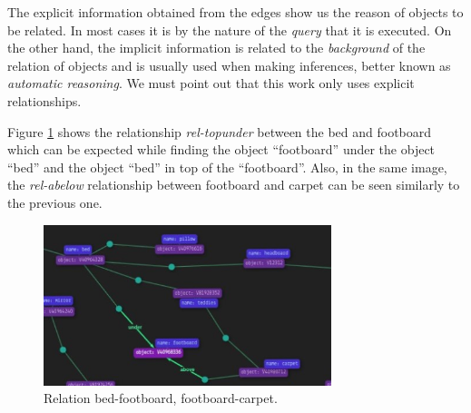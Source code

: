 The explicit information obtained from the edges show us the reason of objects 
to be related. In most cases it is by the nature of the 
\textit{query} that it is executed. On the other hand, the implicit 
information is related to the \textit{background} of the relation of objects 
and is usually used when making inferences, better known as 
\textit{automatic reasoning}. We must point out that this work only 
uses explicit relationships.

Figure \ref{fig:ReGra} shows the relationship \textit{rel-topunder} between the 
bed and footboard which can be expected while finding the object ``footboard'' 
under the object ``bed'' and the object ``bed'' in top of the ``footboard''. 
Also, in the same image, the \textit{rel-abelow} relationship between footboard 
and carpet can be seen similarly to the previous one.

\begin{figure}[H]
    \centering
    \includegraphics[width=8.4cm]{figures/realcionGrafo.jpeg}
    \caption{Relation bed-footboard, footboard-carpet.}
    \label{fig:ReGra}
\end{figure}

